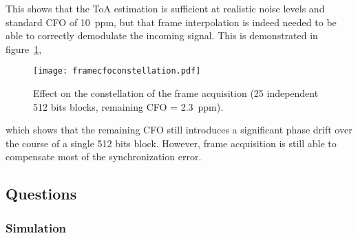 This shows that the ToA estimation is sufficient at realistic noise levels and standard CFO of \SI{10}{ppm}, but that frame interpolation is indeed needed to be able to correctly demodulate the incoming signal.
This is demonstrated in figure~\ref{fig:framecfoconst},
\begin{figure}
  \centering
  \texttt{[image: framecfoconstellation.pdf]}
  \caption[Effect on the constellation of the frame acquisition]{Effect on the constellation of the frame acquisition (25 independent 512 bits blocks, remaining CFO = \SI{2.3}{ppm}).\label{fig:framecfoconst}}
\end{figure}
which shows that the remaining CFO still introduces a significant phase drift over the course of a single 512 bits block. However, frame acquisition is still able to compensate most of the synchronization error.


\subsection{Questions}
\subsubsection{Simulation}

